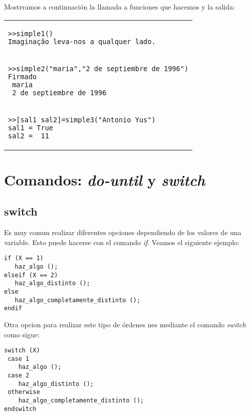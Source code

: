 Mostrramos a continuación la llamada a funciones que hacemos y la salida: 
\begin{mybox}
\begin{tabular}{l}
    \begin{minipage}{0.7\linewidth}
\begin{verbatim} 
>>simple1()
Imaginação leva-nos a qualquer lado.

\end{verbatim}
\end{minipage}\\
 \begin{minipage}{\linewidth}
\begin{verbatim} 
>>simple2("maria","2 de septiembre de 1996")
Firmado 
 maria 
 2 de septiembre de 1996

\end{verbatim}
\end{minipage}\\
 \begin{minipage}{\linewidth}
\begin{verbatim} 
>>[sal1 sal2]=simple3("Antonio Yus")
sal1 = True
sal2 =  11
\end{verbatim}
\end{minipage}
 \end{tabular}
\end{mybox}

\section{Comandos: \textit{do-until} y \textit{switch}}

\subsection{switch}
Es muy comun realizar diferentes opciones dependiendo de los valores de una variable. Esto puede hacerse con el comando \textit{if}. Veamos el siguiente ejemplo:

\begin{octavebox}
\begin{verbatim}
if (X == 1)
   haz_algo ();
elseif (X == 2)
   haz_algo_distinto ();
else
   haz_algo_completamente_distinto ();
endif
\end{verbatim}
\end{octavebox}

Otra opcion para realizar este tipo de órdenes nes mediante el comando \textit{switch} como sigue:

\begin{octavebox}
\begin{verbatim}
switch (X)
 case 1
    haz_algo ();
 case 2
    haz_algo_distinto ();
 otherwise
    haz_algo_completamente_distinto ();
endswitch
\end{verbatim}
\end{octavebox}

